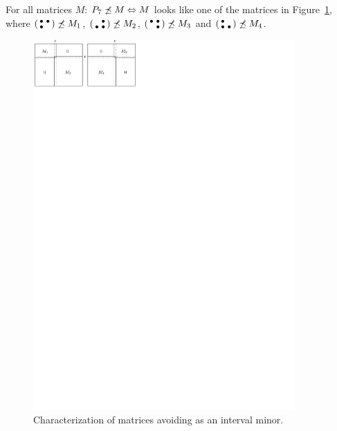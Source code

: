 \begin{prop}
\label{prop:p33}
For all matrices $M$: $P_7\not\preceq M\Leftrightarrow M$ looks like one of the matrices in Figure~\ref{fig:p33}, where $\left(\begin{smallmatrix}\bullet&\bullet\\\bullet& \end{smallmatrix}\right)\not\preceq M_1$, $\left(\begin{smallmatrix} &\bullet\\\bullet&\bullet\end{smallmatrix}\right)\not\preceq M_2$, $\left(\begin{smallmatrix}\bullet&\bullet\\ &\bullet\end{smallmatrix}\right)\not\preceq M_3$ and $\left(\begin{smallmatrix}\bullet& \\\bullet&\bullet\end{smallmatrix}\right)\not\preceq M_4$.
\end{prop}
\begin{figure}[!ht]
\centering
\includegraphics[width=100mm]{img/p33.pdf}
\caption{Characterization of matrices avoiding \usebox{\smlmatb} as an interval minor.}
\label{fig:p33}
\end{figure}
